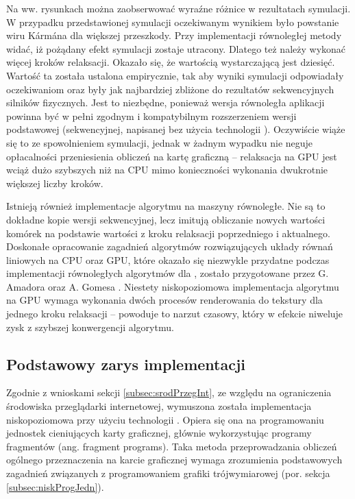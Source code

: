 Na ww. rysunkach można zaobserwować wyraźne różnice w rezultatach symulacji. W
przypadku przedstawionej symulacji oczekiwanym wynikiem było powstanie wiru
Kármána dla większej przeszkody. Przy implementacji równoległej metody
 widać, iż pożądany efekt symulacji zostaje utracony. Dlatego
też należy wykonać więcej kroków relaksacji. Okazało się, że wartością
wystarczającą jest dziesięć. Wartość ta została ustalona empirycznie, tak aby
wyniki symulacji odpowiadały oczekiwaniom oraz były jak najbardziej zbliżone
do rezultatów sekwencyjnych silników fizycznych. Jest to niezbędne, ponieważ
wersja równoległa aplikacji \en powinna być w pełni zgodnym i kompatybilnym
rozszerzeniem wersji podstawowej (sekwencyjnej, napisanej bez użycia
technologii ). Oczywiście wiąże się to ze spowolnieniem symulacji,
jednak w żadnym wypadku nie neguje opłacalności przeniesienia obliczeń na
kartę graficzną -- relaksacja na GPU jest wciąż dużo szybszych niż na CPU mimo
konieczności wykonania dwukrotnie większej liczby kroków.

Istnieją również implementacje algorytmu  na maszyny
równoległe. Nie są to dokładne kopie wersji sekwencyjnej, lecz imitują
obliczanie nowych wartości komórek na podstawie wartości z kroku relaksacji
poprzedniego i aktualnego. Doskonałe opracowanie zagadnień algorytmów
rozwiązujących układy równań liniowych na CPU oraz GPU, które okazało się
niezwykle przydatne podczas implementacji równoległych algorytmów dla \en,
zostało przygotowane przez G. Amadora oraz A. Gomesa \cite{LinSolvers}.
Niestety niskopoziomowa implementacja algorytmu  na GPU
wymaga wykonania dwóch procesów renderowania do tekstury dla jednego kroku
relaksacji -- powoduje to narzut czasowy, który w efekcie niweluje zysk z
szybszej konwergencji algorytmu.

\subsection{Podstawowy zarys implementacji}

Zgodnie z wnioskami sekcji \ref{subsec:srodPrzegInt}, ze względu na ograniczenia
środowiska przeglądarki internetowej, wymuszona została implementacja
niskopoziomowa przy użyciu technologii . Opiera się ona na
programowaniu jednostek cieniujących karty graficznej, głównie wykorzystując
programy fragmentów (ang. fragment programs). Taka metoda przeprowadzania
obliczeń ogólnego przeznaczenia na karcie graficznej wymaga zrozumienia
podstawowych zagadnień związanych z programowaniem grafiki trójwymiarowej (por.
sekcja \ref{subsec:niskProgJedn}).

